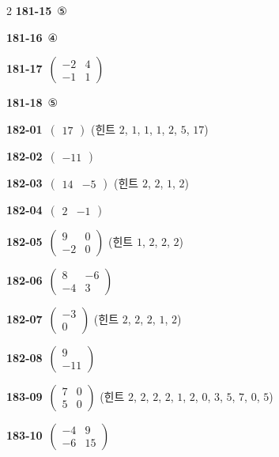 \documentclass[10pt,a4paper]{article}
\begin{document}
\begin{multicols}{2}
\noindent\textbf{181-15}\ ⑤\par
\noindent\textbf{181-16}\ ④\par
\noindent\textbf{181-17}\ $\begin{pmatrix} -2 & 4 \\ -1 & 1 \end{pmatrix}$\par
\noindent\textbf{181-18}\ ⑤\par
\noindent\textbf{182-01}\ $\begin{pmatrix} 17 \end{pmatrix}$ (힌트 $2$, $1$, $1$, $1$, $2$, $5$, $17$)\par
\noindent\textbf{182-02}\ $\begin{pmatrix} -11 \end{pmatrix}$\par
\noindent\textbf{182-03}\ $\begin{pmatrix} 14 & -5 \end{pmatrix}$ (힌트 $2$, $2$, $1$, $2$)\par
\noindent\textbf{182-04}\ $\begin{pmatrix} 2 & -1 \end{pmatrix}$\par
\noindent\textbf{182-05}\ $\begin{pmatrix} 9 & 0 \\ -2 & 0 \end{pmatrix}$ (힌트 $1$, $2$, $2$, $2$)\par
\noindent\textbf{182-06}\ $\begin{pmatrix} 8 & -6 \\ -4 & 3 \end{pmatrix}$\par
\noindent\textbf{182-07}\ $\begin{pmatrix} -3 \\ 0 \end{pmatrix}$ (힌트 $2$, $2$, $2$, $1$, $2$)\par
\noindent\textbf{182-08}\ $\begin{pmatrix} 9 \\ -11 \end{pmatrix}$\par
\noindent\textbf{183-09}\ $\begin{pmatrix} 7 & 0 \\ 5 & 0 \end{pmatrix}$ (힌트 $2$, $2$, $2$, $2$, $1$, $2$, $0$, $3$, $5$, $7$, $0$, $5$)\par
\noindent\textbf{183-10}\ $\begin{pmatrix} -4 & 9 \\ -6 & 15 \end{pmatrix}$\par

\end{multicols}
\end{document}
